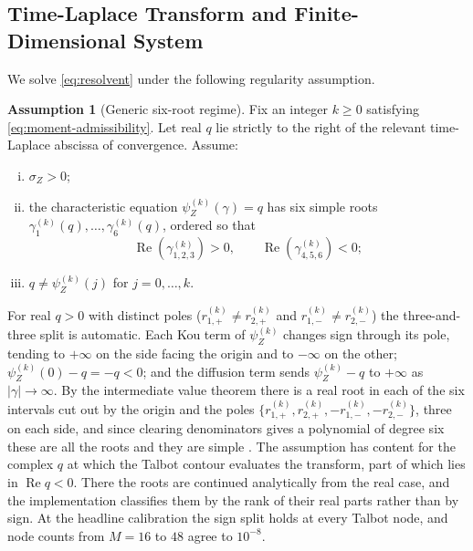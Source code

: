 \documentclass[11pt]{article}
\newcommand{\Rea}{\operatorname{Re}}
\theoremstyle{plain}
\theoremstyle{definition}
\newtheorem{assumption}{Assumption}[section]
\theoremstyle{remark}
\begin{document}
\subsection{Time-Laplace Transform and Finite-Dimensional System}

We solve \eqref{eq:resolvent} under the following regularity assumption.

\begin{assumption}[Generic six-root regime]\label{ass:six-root}
Fix an integer $k\ge0$ satisfying \eqref{eq:moment-admissibility}. Let real $q$ lie
strictly to the right of the relevant time-Laplace abscissa of convergence. Assume:
\begin{enumerate}[(i)]
\item $\sigma_Z>0$;
\item the characteristic equation $\psi_Z^{(k)}(\gamma)=q$ has six simple roots
$\gamma_1^{(k)}(q),\dots,\gamma_6^{(k)}(q)$, ordered so that
\[
\Rea(\gamma_{1,2,3}^{(k)})>0,
\qquad
\Rea(\gamma_{4,5,6}^{(k)})<0;
\]
\item $q\neq \psi_Z^{(k)}(j)$ for $j=0,\dots,k$.
\end{enumerate}
\end{assumption}

\noindent
For real $q>0$ with distinct poles ($r_{1,+}^{(k)}\neq r_{2,+}^{(k)}$ and $r_{1,-}^{(k)}\neq r_{2,-}^{(k)}$)
the three-and-three split is automatic. Each Kou term of $\psi_Z^{(k)}$ changes sign
through its pole, tending to $+\infty$ on the side facing the origin and to $-\infty$ on the other;
$\psi_Z^{(k)}(0)-q=-q<0$; and the diffusion term sends $\psi_Z^{(k)}-q$ to $+\infty$ as
$|\gamma|\to\infty$. By the intermediate value theorem there is a real root in each of the six
intervals cut out by the origin and the poles $\{r_{1,+}^{(k)},r_{2,+}^{(k)},-r_{1,-}^{(k)},-r_{2,-}^{(k)}\}$,
three on each side, and since clearing denominators gives a polynomial of degree six these are all the
roots and they are simple \citep{KouWang2003,Sepp2004,CaiKou2011}. The assumption has content for the
complex $q$ at which the Talbot contour evaluates the transform, part of which lies in
$\Rea q<0$. There the roots are continued analytically from the real case, and the implementation
classifies them by the rank of their real parts rather than by sign. At the headline calibration the
sign split holds at every Talbot node, and node counts from $M=16$ to $48$ agree to $10^{-8}$.
\end{document}
